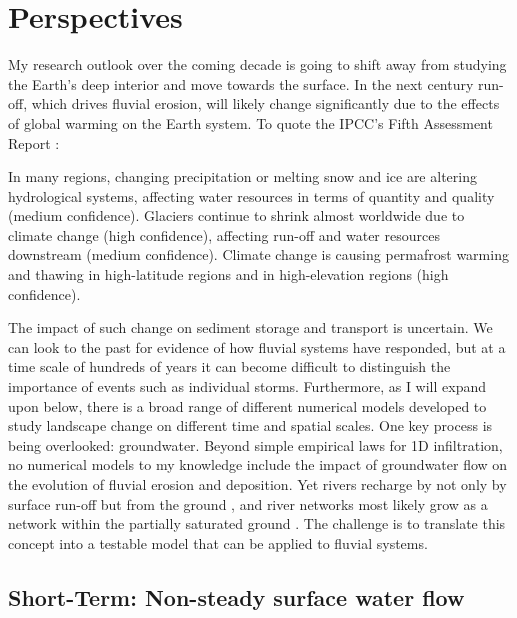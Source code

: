 \chapter{Perspectives}

My research outlook over the coming decade is going to shift away from studying the Earth's deep interior and move towards the surface. In the next century run-off, which drives fluvial erosion, will likely change significantly due to the effects of global warming on the Earth system. To quote the IPCC's Fifth Assessment Report \cite{IPCC-policy-2014}:

\begin{displayquote}
In many regions, changing precipitation or melting snow and ice are altering hydrological systems, affecting water resources in terms of quantity and quality (medium confidence). Glaciers continue to shrink almost worldwide due to climate change (high confidence), affecting run-off and water resources downstream (medium confidence). Climate change is causing permafrost warming and thawing in high-latitude regions and in high-elevation regions (high confidence).
\end{displayquote}

The impact of such change on sediment storage and transport is uncertain. We can look to the past for evidence of how fluvial systems have responded, but at a time scale of hundreds of years it can become difficult to distinguish the importance of events such as individual storms. Furthermore, as I will expand upon below, there is a broad range of different numerical models developed to study landscape change on different time and spatial scales. One key process is being overlooked: groundwater. Beyond simple empirical laws for 1D infiltration, no numerical models to my knowledge include the impact of groundwater flow on the evolution of fluvial erosion and deposition. Yet rivers recharge by not only by surface run-off but from the ground \citep[e.g.][]{condon-etal-2020}, and river networks most likely grow as a network within the partially saturated ground \citep[e.g.][]{fan-etal-2019}. The challenge is to translate this concept into a testable model that can be applied to fluvial systems.

\section{Short-Term: Non-steady surface water flow}

